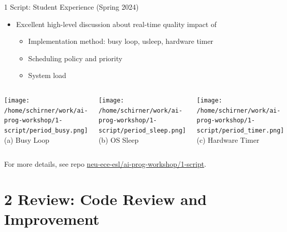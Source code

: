 \documentclass[xcolor=dvipsnames, aspectratio=169]{beamer}
\begin{document}
\begin{frame}{1 Script: Student Experience (Spring 2024)} 
    \begin{infobox}
    \begin{itemize}
        \item Excellent high-level discussion about real-time quality impact of
        \begin{itemize}
            \item Implementation method: busy loop, usleep, hardware timer
            \item Scheduling policy and priority 
            \item System load 
        \end{itemize}
    \end{itemize}
    \end{infobox}
    \begin{columns}
        \texttt{[image: /home/schirner/work/ai-prog-workshop/1-script/period\_busy.png]}
        \tiny\centering (a) Busy Loop
        
        \texttt{[image: /home/schirner/work/ai-prog-workshop/1-script/period\_sleep.png]}
        \tiny\centering (b) OS Sleep
        
        \texttt{[image: /home/schirner/work/ai-prog-workshop/1-script/period\_timer.png]}
        \tiny\centering (c) Hardware Timer
    \end{columns}
    \vspace{0.5em}
    \tiny For more details, see repo \href{https://github.com/neu-ece-esl/ai-prog-workshop/tree/main/1-script}{neu-ece-esl/ai-prog-workshop/1-script}.  
\end{frame}


\section{2 Review: Code Review and Improvement}
\end{document}
